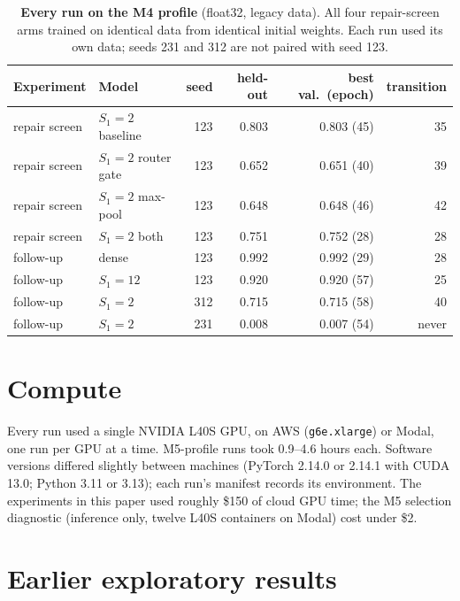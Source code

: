\begin{table}[h]
\centering
\scriptsize
\begin{tabular}{llrrrr}
\toprule
Experiment & Model & seed & held-out & best val.\ (epoch) & transition \\
\midrule
repair screen & $S_1{=}2$ baseline & 123 & 0.803 & 0.803 (45) & 35 \\
repair screen & $S_1{=}2$ router gate & 123 & 0.652 & 0.651 (40) & 39 \\
repair screen & $S_1{=}2$ max-pool & 123 & 0.648 & 0.648 (46) & 42 \\
repair screen & $S_1{=}2$ both & 123 & 0.751 & 0.752 (28) & 28 \\
follow-up & dense & 123 & 0.992 & 0.992 (29) & 28 \\
follow-up & $S_1{=}12$ & 123 & 0.920 & 0.920 (57) & 25 \\
follow-up & $S_1{=}2$ & 312 & 0.715 & 0.715 (58) & 40 \\
follow-up & $S_1{=}2$ & 231 & 0.008 & 0.007 (54) & never \\
\bottomrule
\end{tabular}
\caption{\textbf{Every run on the M4 profile} (float32, legacy data). All four repair-screen arms trained on
identical data from identical initial weights. Each run used its own data; seeds 231 and 312 are not paired with
seed 123.}
\label{tab:m4runs}
\end{table}

\section{Compute}
\label{app:compute}

Every run used a single NVIDIA L40S GPU, on AWS (\texttt{g6e.xlarge}) or Modal, one run per GPU at a time. M5-profile
runs took 0.9--4.6 hours each. Software versions differed slightly between machines (PyTorch 2.14.0 or 2.14.1 with
CUDA 13.0; Python 3.11 or 3.13); each run's manifest records its environment. The experiments in this paper used
roughly \$150 of cloud GPU time; the M5 selection diagnostic (inference only, twelve L40S containers on Modal) cost
under \$2.

\section{Earlier exploratory results}
\label{app:history}

